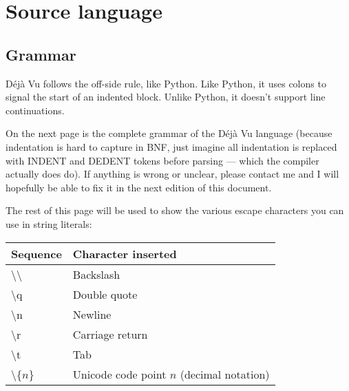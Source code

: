 \chapter{Source language}

\newcommand\grammar[1]{\underline{#1}}

\section{Grammar}
Déjà Vu follows the off-side rule, like Python. Like Python, it uses colons to signal the start of an indented block. Unlike Python, it doesn't support line continuations.

On the next page is the complete grammar of the Déjà Vu language (because indentation is hard to capture in BNF, just imagine all indentation is replaced with INDENT and DEDENT tokens before parsing --- which the compiler actually does do). If anything is wrong or unclear, please contact me and I will hopefully be able to fix it in the next edition of this document.

The rest of this page will be used to show the various escape characters you can use in string literals:

\bigskip

\begin{tabular}{ l l }
\textbf{Sequence} & \textbf{Character inserted}\\
\hline
\textbackslash{}\textbackslash{} & Backslash\\
\textbackslash{}q & Double quote\\
\textbackslash{}n & Newline\\
\textbackslash{}r & Carriage return\\
\textbackslash{}t & Tab\\
\textbackslash{}\{$n$\} & Unicode code point $n$ (decimal notation)\\
\end{tabular}

